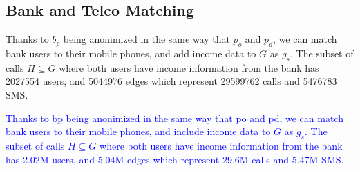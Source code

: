 \subsection{Bank and Telco Matching}

Thanks to \( b_p \) being anonimized in the same way that \( p_o \) and \( p_d \), we can match bank users to their mobile phones, and add income data to \( G \) as \( g_s \). The subset of calls \( H \subseteq G \) where both users have income information from the bank has \num{2027554} users, and \num{5044976} edges which represent \num{29599762} calls and \num{5476783} SMS.

\textcolor{blue}{Thanks to bp being anonimized in the same way that po and pd, we can match bank users to their mobile phones, and include income data to \( G \) as \( g_s \). The subset of calls \( H \subseteq G \) where both users have income information from the bank has 2.02M users, and 5.04M edges which represent 29.6M calls and 5.47M SMS.}